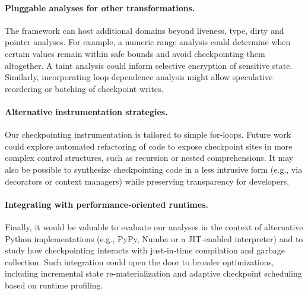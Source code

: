 \paragraph{Pluggable analyses for other transformations.} The framework can host additional domains beyond liveness, type, dirty and pointer analyses. For example, a numeric range analysis could determine when certain values remain within safe bounds and avoid checkpointing them altogether. A taint analysis could inform selective encryption of sensitive state. Similarly, incorporating loop dependence analysis might allow speculative reordering or batching of checkpoint writes.

\paragraph{Alternative instrumentation strategies.} Our checkpointing instrumentation is tailored to simple for‑loops. Future work could explore automated refactoring of code to expose checkpoint sites in more complex control structures, such as recursion or nested comprehensions. It may also be possible to synthesize checkpointing code in a less intrusive form (e.g., via decorators or context managers) while preserving transparency for developers.

\paragraph{Integrating with performance‑oriented runtimes.} Finally, it would be valuable to evaluate our analyses in the context of alternative Python implementations (e.g., PyPy, Numba or a JIT‑enabled interpreter) and to study how checkpointing interacts with just‑in‑time compilation and garbage collection. Such integration could open the door to broader optimizations, including incremental state re‑materialization and adaptive checkpoint scheduling based on runtime profiling.
